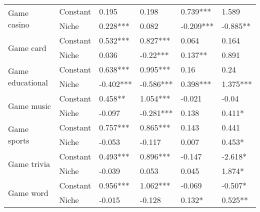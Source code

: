 \begin{table}[h!]
\begin{tabular}{llllll}
\cline{1-6}
\multirow{2}{*}{Game casino} & Constant &  0.195 &  0.198 &  0.739*** &  1.589 \\
          & Niche &  0.228*** &  0.082 &  -0.209*** &  -0.885** \\
\cline{1-6}
\multirow{2}{*}{Game card} & Constant &  0.532*** &  0.827*** &  0.064 &  0.164 \\
          & Niche &  0.036 &  -0.22*** &  0.137** &  0.891 \\
\cline{1-6}
\multirow{2}{*}{Game educational} & Constant &  0.638*** &  0.995*** &  0.16 &  0.24 \\
          & Niche &  -0.402*** &  -0.586*** &  0.398*** &  1.375*** \\
\cline{1-6}
\multirow{2}{*}{Game music} & Constant &  0.458** &  1.054*** &  -0.021 &  -0.04 \\
          & Niche &  -0.097 &  -0.281*** &  0.138 &  0.411* \\
\cline{1-6}
\multirow{2}{*}{Game sports} & Constant &  0.757*** &  0.865*** &  0.143 &  0.441 \\
          & Niche &  -0.053 &  -0.117 &  0.007 &  0.453* \\
\cline{1-6}
\multirow{2}{*}{Game trivia} & Constant &  0.493*** &  0.896*** &  -0.147 &  -2.618* \\
          & Niche &  -0.039 &  0.053 &  0.045 &  1.874* \\
\cline{1-6}
\multirow{2}{*}{Game word} & Constant &  0.956*** &  1.062*** &  -0.069 &  -0.507* \\
          & Niche &  -0.015 &  -0.128 &  0.132* &  0.525** \\
\bottomrule
\end{tabular}
\end{table}
